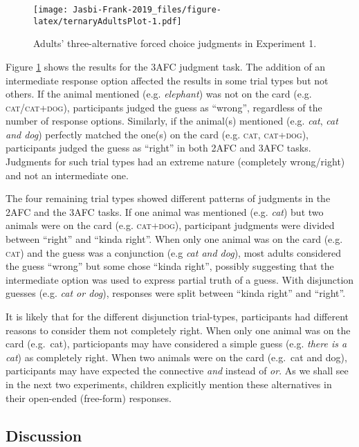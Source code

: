 \documentclass[,man,floatsintext]{apa6}
\begin{document}
\begin{figure}
\centering
\texttt{[image: Jasbi-Frank-2019\_files/figure-latex/ternaryAdultsPlot-1.pdf]}
\caption{\label{fig:ternaryAdultsPlot}Adults' three-alternative forced choice judgments in Experiment 1.}
\end{figure}

Figure \ref{fig:ternaryAdultsPlot} shows the results for the 3AFC judgment task. The addition of an intermediate response option affected the results in some trial types but not others. If the animal mentioned (e.g. \emph{elephant}) was not on the card (e.g. \textsc{cat/cat+dog}), participants judged the guess as \enquote{wrong}, regardless of the number of response options. Similarly, if the animal(s) mentioned (e.g. \emph{cat}, \emph{cat and dog}) perfectly matched the one(s) on the card (e.g. \textsc{cat}, \textsc{cat+dog}), participants judged the guess as \enquote{right} in both 2AFC and 3AFC tasks. Judgments for such trial types had an extreme nature (completely wrong/right) and not an intermediate one.

The four remaining trial types showed different patterns of judgments in the 2AFC and the 3AFC tasks. If one animal was mentioned (e.g. \emph{cat}) but two animals were on the card (e.g. \textsc{cat+dog}), participant judgments were divided between \enquote{right} and \enquote{kinda right}. When only one animal was on the card (e.g. \textsc{cat}) and the guess was a conjunction (e.g \emph{cat and dog}), most adults considered the guess \enquote{wrong} but some chose \enquote{kinda right}, possibly suggesting that the intermediate option was used to express partial truth of a guess. With disjunction guesses (e.g. \emph{cat or dog}), responses were split between \enquote{kinda right} and \enquote{right}.

It is likely that for the different disjunction trial-types, participants had different reasons to consider them not completely right. When only one animal was on the card (e.g.~cat), particiopants may have considered a simple guess (e.g. \emph{there is a cat}) as completely right. When two animals were on the card (e.g.~cat and dog), participants may have expected the connective \emph{and} instead of \emph{or}. As we shall see in the next two experiments, children explicitly mention these alternatives in their open-ended (free-form) responses.

\hypertarget{discussion}{%
\subsection{Discussion}\label{discussion}}
\end{document}

